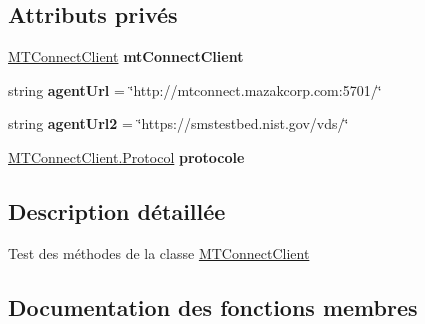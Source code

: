 \subsection*{Attributs privés}
\begin{DoxyCompactItemize}
\item 
\mbox{\label{class_m_t_connect_agent_1_1_b_l_l_1_1_tests_1_1_m_t_connect_client_tests_af4b9a9b854925f636589f1487f0d95cb}} 
\mbox{\hyperlink{class_m_t_connect_agent_1_1_b_l_l_1_1_m_t_connect_client}{M\+T\+Connect\+Client}} {\bfseries mt\+Connect\+Client}
\item 
\mbox{\label{class_m_t_connect_agent_1_1_b_l_l_1_1_tests_1_1_m_t_connect_client_tests_afbdadd2af552ebc1f2953ad599363876}} 
string {\bfseries agent\+Url} = \char`\"{}http\+://mtconnect.\+mazakcorp.\+com\+:5701/\char`\"{}
\item 
\mbox{\label{class_m_t_connect_agent_1_1_b_l_l_1_1_tests_1_1_m_t_connect_client_tests_ac66f82b312e893fc44914f5c7a83b42b}} 
string {\bfseries agent\+Url2} = \char`\"{}https\+://smstestbed.\+nist.\+gov/vds/\char`\"{}
\item 
\mbox{\label{class_m_t_connect_agent_1_1_b_l_l_1_1_tests_1_1_m_t_connect_client_tests_a102f3253321c2caeabab74fbf403309d}} 
\mbox{\hyperlink{class_m_t_connect_agent_1_1_b_l_l_1_1_m_t_connect_client_a2f390f74a0ad3ee5147e9438ceed6474}{M\+T\+Connect\+Client.\+Protocol}} {\bfseries protocole}
\end{DoxyCompactItemize}


\subsection{Description détaillée}
Test des méthodes de la classe \mbox{\hyperlink{class_m_t_connect_agent_1_1_b_l_l_1_1_m_t_connect_client}{M\+T\+Connect\+Client}} 



\subsection{Documentation des fonctions membres}
\mbox{\label{class_m_t_connect_agent_1_1_b_l_l_1_1_tests_1_1_m_t_connect_client_tests_ae181d3ad818f02ada1489c393a6109d0}} 
